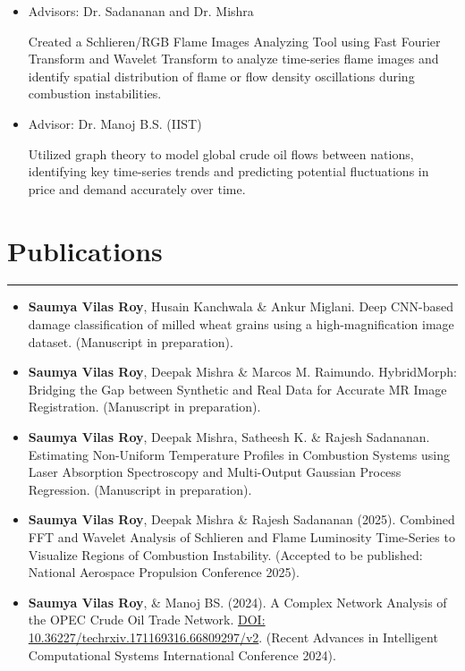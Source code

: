 \documentclass[11pt]{article}
\newlength{\sectionvspace}
\begin{document}
\begin{itemize}[leftmargin=*,noitemsep,topsep=0pt]
\begin{itemize}[leftmargin=*,noitemsep,topsep=0pt]
		
		\item Advisors: Dr. Sadananan and Dr. Mishra
		
Created a Schlieren/RGB Flame Images Analyzing Tool using Fast Fourier Transform and Wavelet Transform to analyze time-series flame images and identify spatial distribution of flame or flow density oscillations during combustion instabilities.
		\item Advisor: Dr. Manoj B.S. (IIST) 
		
Utilized graph theory to model global crude oil flows between nations, identifying key time-series trends and predicting potential fluctuations in price and demand accurately over time.
		
	\end{itemize}
					\end{itemize}
	
		\section*{\bf Publications}
	\vspace{\sectionvspace}
	\rule{\textwidth}{0.4pt}
	\begin{itemize}[leftmargin=*,noitemsep,topsep=0pt]
		
		
		\item \textbf{Saumya Vilas Roy}, Husain Kanchwala \& Ankur Miglani. Deep CNN-based damage classification of milled wheat grains using a high-magnification image dataset. (Manuscript in preparation).
		
		\item  \textbf{Saumya Vilas Roy}, Deepak Mishra \& Marcos M. Raimundo. HybridMorph: Bridging the Gap between Synthetic and Real Data for Accurate MR Image Registration. (Manuscript in preparation).
		
		\item \textbf{Saumya Vilas Roy}, Deepak Mishra, Satheesh K. \& Rajesh Sadananan. Estimating Non-Uniform Temperature Profiles in Combustion Systems using Laser Absorption Spectroscopy and Multi-Output Gaussian Process Regression. (Manuscript in preparation).
		
		\item \textbf{Saumya Vilas Roy}, Deepak Mishra \& Rajesh Sadananan (2025). Combined FFT and Wavelet Analysis of Schlieren and Flame Luminosity Time-Series to Visualize Regions of Combustion Instability. (Accepted to be published: National Aerospace Propulsion Conference 2025).
		
		\item \textbf{Saumya Vilas Roy}, \& Manoj BS. (2024). A Complex Network Analysis of the OPEC Crude Oil Trade Network. \href{https://doi.org/10.36227/techrxiv.171169316.66809297/v2}{DOI: 10.36227/techrxiv.171169316.66809297/v2}. (Recent Advances in Intelligent Computational Systems International Conference 2024).
		
	\end{itemize}
	
\end{document}
